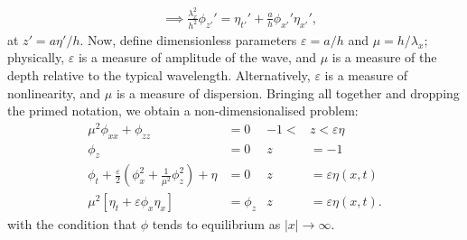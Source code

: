 \documentclass[10pt,reqno,oneside,a4paper]{article}
\begin{document}
\begin{appendices}
\begin{align*}
&\implies \frac{\lambda_x^2}{h^2} \phi_{z'}'= \eta_{t'}' + \frac{a}{h} \phi_{x'}' \eta_{x'}',
\end{align*}
at $z' = a\eta'/h.$ Now, define dimensionless parameters $\varepsilon = a/h$ and $\mu = h/\lambda_x;$ physically, $\varepsilon$ is a measure of amplitude of the wave, and $\mu$ is a measure of the depth relative to the typical wavelength. Alternatively, $\varepsilon$ is a measure of nonlinearity, and $\mu$ is a measure of dispersion. Bringing all together and dropping the primed notation, we obtain a non-dimensionalised problem:
\begin{subequations}\label{WLP1DND1}
\begin{align}
\label{1PDEND1}  \mu^2 \phi_{xx} + \phi_{zz} &= 0 &-1 <&z < \varepsilon\eta \\
\label{1BC1ND1} \phi_z &= 0 &z &= -1  \\ 
\label{1BC2ND1} \phi_{t} + \frac{\varepsilon}{2} \left(\phi_{x}^2 + \frac{1}{\mu^2}\phi_{z}^2\right) + \eta &= 0 &z &= \varepsilon\eta(x,t)\\
\label{1BC3ND1} \mu^2 \left[\eta_{t} + \varepsilon \phi_{x} \eta_{x}\right] &= \phi_{z} &z &= \varepsilon\eta(x,t).
\end{align}
\end{subequations}
with the condition that $\phi$ tends to equilibrium as $|x|\to \infty.$


\end{appendices}
\end{document}

